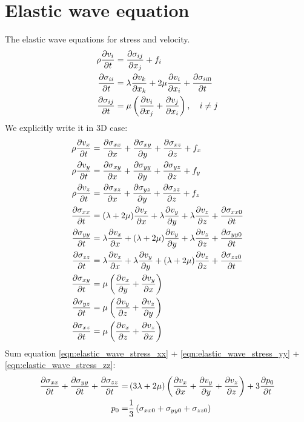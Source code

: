 \documentclass[pdftex,a4paper,parskip,listof=totoc,bibliography=totoc,onehalfspacing,12pt]{scrreprt}
\begin{document}
\section{Elastic wave equation}
\label{sec:elastic}
The elastic wave equations for stress and velocity.
\begin{align}
\label{eqn:elastic_wave_stress_xx}
\rho\pdv{v_i}{t}&=\pdv{\sigma_{ij}}{x_j}+ f_i\\
\pdv{\sigma_{ii}}{t} &= \lambda \pdv{v_k}{x_k} + 2\mu \pdv{v_i}{x_i}+\pdv{\sigma_{ii0}}{t}\\
\pdv{\sigma_{ij}}{t} &= \mu \left(\pdv{v_i}{x_j} +\pdv{v_j}{x_i}\right), \quad i \neq j
\end{align}
We explicitly write it in 3D case:
\begin{align}
\rho\pdv{v_x}{t}&=\pdv{\sigma_{xx}}{x}+\pdv{\sigma_{xy}}{y} + \pdv{\sigma_{xz}}{z}+ f_x\\
\rho\pdv{v_y}{t}&=\pdv{\sigma_{xy}}{x}+\pdv{\sigma_{yy}}{y} + \pdv{\sigma_{yz}}{z} + f_y\\
\rho\pdv{v_z}{t}&=\pdv{\sigma_{xz}}{x}+\pdv{\sigma_{yz}}{y} + \pdv{\sigma_{zz}}{z} + f_z\\ 
\label{eqn:elastic_wave_stress_xx}
\pdv{\sigma_{xx}}{t} &= (\lambda+2\mu) \pdv{v_x}{x} + \lambda \pdv{v_y}{y} + \lambda \pdv{v_z}{z} + \pdv{\sigma_{xx0}}{t}\\
\label{eqn:elastic_wave_stress_yy}
\pdv{\sigma_{yy}}{t} &= \lambda \pdv{v_x}{x} + (\lambda+2\mu) \pdv{v_y}{y} + \lambda \pdv{v_z}{z} + \pdv{\sigma_{yy0}}{t}\\ 
\label{eqn:elastic_wave_stress_zz}
\pdv{\sigma_{zz}}{t} &= \lambda \pdv{v_x}{x} +  \lambda \pdv{v_y}{y} + (\lambda+2\mu) \pdv{v_z}{z} + \pdv{\sigma_{zz0}}{t}\\
\pdv{\sigma_{xy}}{t} &= \mu \left(\pdv{v_x}{y} +\pdv{v_y}{x}\right)\\
\pdv{\sigma_{yz}}{t} &= \mu \left(\pdv{v_y}{z} +\pdv{v_z}{y}\right) \\
\pdv{\sigma_{xz}}{t} &= \mu \left(\pdv{v_x}{z} +\pdv{v_z}{x}\right)
\end{align}
Sum equation \ref{eqn:elastic_wave_stress_xx} + \ref{eqn:elastic_wave_stress_yy} + \ref{eqn:elastic_wave_stress_zz}:
\begin{equation}
\begin{aligned}
 \pdv{\sigma_{xx}}{t}+\pdv{\sigma_{yy}}{t}+\pdv{\sigma_{zz}}{t} =& \left(3\lambda+2\mu\right)\left(\pdv{v_x}{x}+\pdv{v_y}{y}+ \pdv{v_z}{z}\right) + 3 \pdv{p_0}{t}\\ 
 p_0 =& \frac{1}{3} \left( \sigma_{xx0}+\sigma_{yy0}+\sigma_{zz0} \right)
\end{aligned}
\end{equation}
\end{document}
